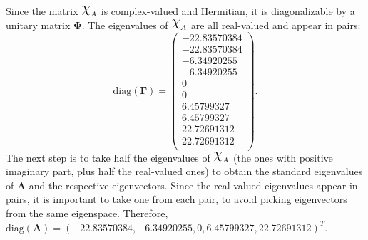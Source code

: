 Since the matrix $\rchi_A$ is complex-valued and Hermitian, it is diagonalizable by a unitary matrix $\mathbf{\Phi}$. The eigenvalues of $\rchi_A$ are all real-valued and appear in pairs:
\begin{equation*}
    \mathrm{diag}(\mathbf{\Gamma}) = \begin{pmatrix}
        -22.83570384 \\
        -22.83570384 \\
        -6.34920255  \\
        -6.34920255  \\
        0            \\
        0            \\
        6.45799327   \\
        6.45799327   \\
        22.72691312  \\
        22.72691312  \\
    \end{pmatrix}.
\end{equation*}
The next step is to take half the eigenvalues of $\rchi_A$ (the ones with positive imaginary part, plus half the real-valued ones) to obtain the standard eigenvalues of $\mathbf{A}$ and the respective eigenvectors. Since the real-valued eigenvalues appear in pairs, it is important to take one from each pair, to avoid picking eigenvectors from the same eigenspace. Therefore, $\mathrm{diag}(\mathbf{A}) = (-22.83570384, -6.34920255, 0, 6.45799327, 22.72691312)^T$.


